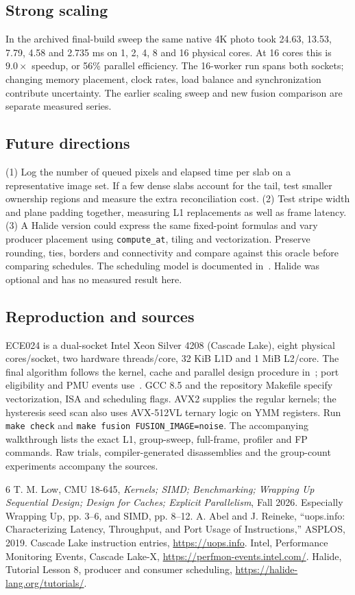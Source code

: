 \documentclass[10pt,conference,letterpaper]{IEEEtran}
\newcommand{\head}[1]{\subsection*{#1}}
\newcommand{\code}[1]{\texttt{#1}}
\begin{document}
\head{Strong scaling}
In the archived final-build sweep the same native 4K photo took 24.63, 13.53, 7.79, 4.58 and 2.735 ms on 1, 2, 4, 8 and 16 physical cores. At 16 cores this is $9.0\times$ speedup, or 56\% parallel efficiency. The 16-worker run spans both sockets; changing memory placement, clock rates, load balance and synchronization contribute uncertainty. The earlier scaling sweep and new fusion comparison are separate measured series.
\newpage
\head{Future directions}
(1) Log the number of queued pixels and elapsed time per slab on a representative image set. If a few dense slabs account for the tail, test smaller ownership regions and measure the extra reconciliation cost. (2) Test stripe width and plane padding together, measuring L1 replacements as well as frame latency. (3) A Halide version could express the same fixed-point formulas and vary producer placement using \code{compute\_at}, tiling and vectorization. Preserve rounding, ties, borders and connectivity and compare against this oracle before comparing schedules. The scheduling model is documented in~\cite{halide}. Halide was optional and has no measured result here.
\head{Reproduction and sources}
ECE024 is a dual-socket Intel Xeon Silver 4208 (Cascade Lake), eight physical cores/socket, two hardware threads/core, 32 KiB L1D and 1 MiB L2/core. The final algorithm follows the kernel, cache and parallel design procedure in~\cite{course}; port eligibility and PMU events use~\cite{peak,pmu}. GCC 8.5 and the repository Makefile specify vectorization, ISA and scheduling flags. AVX2 supplies the regular kernels; the hysteresis seed scan also uses AVX-512VL ternary logic on YMM registers. Run \code{make check} and \code{make fusion FUSION\_IMAGE=noise}. The accompanying walkthrough lists the exact L1, group-sweep, full-frame, profiler and FP commands. Raw trials, compiler-generated disassemblies and the group-count experiments accompany the sources.
\footnotesize
\begin{thebibliography}{6}
 T. M. Low, CMU 18-645, \emph{Kernels; SIMD; Benchmarking; Wrapping Up Sequential Design; Design for Caches; Explicit Parallelism}, Fall 2026. Especially Wrapping Up, pp. 3--6, and SIMD, pp. 8--12.
 A. Abel and J. Reineke, ``uops.info: Characterizing Latency, Throughput, and Port Usage of Instructions,'' ASPLOS, 2019. Cascade Lake instruction entries, \url{https://uops.info}.
 Intel, Performance Monitoring Events, Cascade Lake-X, \url{https://perfmon-events.intel.com/}.
 Halide, Tutorial Lesson 8, producer and consumer scheduling, \url{https://halide-lang.org/tutorials/}.
\end{thebibliography}
\end{document}
